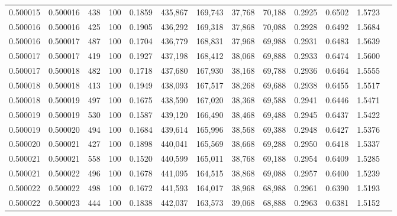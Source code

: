 \begin{tabular}{rrrrrrrrrrrrr}
0.500015 & 0.500016 &   438 & 100 &                                     0.1859 & 435,867 & 169,743 &  37,768 &  70,188 & 0.2925 & 0.6502 & 1.5723 \\
0.500016 & 0.500016 &   425 & 100 &                                     0.1905 & 436,292 & 169,318 &  37,868 &  70,088 & 0.2928 & 0.6492 & 1.5684 \\
0.500016 & 0.500017 &   487 & 100 &                                     0.1704 & 436,779 & 168,831 &  37,968 &  69,988 & 0.2931 & 0.6483 & 1.5639 \\
0.500017 & 0.500017 &   419 & 100 &                                     0.1927 & 437,198 & 168,412 &  38,068 &  69,888 & 0.2933 & 0.6474 & 1.5600 \\
0.500017 & 0.500018 &   482 & 100 &                                     0.1718 & 437,680 & 167,930 &  38,168 &  69,788 & 0.2936 & 0.6464 & 1.5555 \\
0.500018 & 0.500018 &   413 & 100 &                                     0.1949 & 438,093 & 167,517 &  38,268 &  69,688 & 0.2938 & 0.6455 & 1.5517 \\
0.500018 & 0.500019 &   497 & 100 &                                     0.1675 & 438,590 & 167,020 &  38,368 &  69,588 & 0.2941 & 0.6446 & 1.5471 \\
0.500019 & 0.500019 &   530 & 100 &                                     0.1587 & 439,120 & 166,490 &  38,468 &  69,488 & 0.2945 & 0.6437 & 1.5422 \\
0.500019 & 0.500020 &   494 & 100 &                                     0.1684 & 439,614 & 165,996 &  38,568 &  69,388 & 0.2948 & 0.6427 & 1.5376 \\
0.500020 & 0.500021 &   427 & 100 &                                     0.1898 & 440,041 & 165,569 &  38,668 &  69,288 & 0.2950 & 0.6418 & 1.5337 \\
0.500021 & 0.500021 &   558 & 100 &                                     0.1520 & 440,599 & 165,011 &  38,768 &  69,188 & 0.2954 & 0.6409 & 1.5285 \\
0.500021 & 0.500022 &   496 & 100 &                                     0.1678 & 441,095 & 164,515 &  38,868 &  69,088 & 0.2957 & 0.6400 & 1.5239 \\
0.500022 & 0.500022 &   498 & 100 &                                     0.1672 & 441,593 & 164,017 &  38,968 &  68,988 & 0.2961 & 0.6390 & 1.5193 \\
0.500022 & 0.500023 &   444 & 100 &                                     0.1838 & 442,037 & 163,573 &  39,068 &  68,888 & 0.2963 & 0.6381 & 1.5152 \\

\end{tabular}
